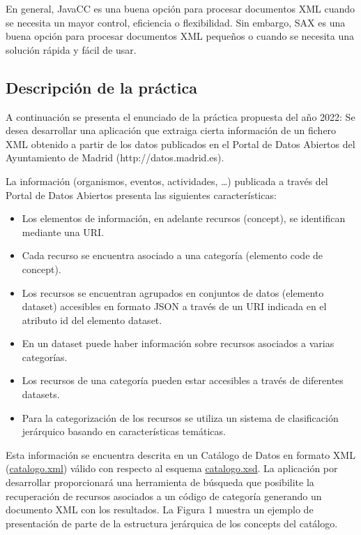 En general, JavaCC es una buena opción para procesar documentos XML cuando se necesita un mayor control, eficiencia o flexibilidad. Sin embargo, SAX es una buena opción para procesar documentos XML pequeños o cuando se necesita una solución rápida y fácil de usar.

\subsection{Descripción de la práctica}

A continuación se presenta el enunciado de la práctica propuesta del año 2022:
Se desea desarrollar una aplicación que extraiga cierta información de un fichero XML obtenido a partir de los datos publicados en el Portal de Datos Abiertos del Ayuntamiento de Madrid (http://datos.madrid.es).

La información (organismos, eventos, actividades, …) publicada a través del Portal de Datos Abiertos presenta las siguientes características:

\begin{itemize}
    \item Los elementos de información, en adelante recursos (concept), se identifican mediante una URI.
    \item Cada recurso se encuentra asociado a una categoría (elemento code de concept).
    \item Los recursos se encuentran agrupados en conjuntos de datos (elemento dataset) accesibles en formato JSON a través de un URI indicada en el atributo id del elemento dataset.
    \item En un dataset puede haber información sobre recursos asociados a varias categorías.
    \item Los recursos de una categoría pueden estar accesibles a través de diferentes datasets.
    \item Para la categorización de los recursos se utiliza un sistema de clasificación jerárquico basando en características temáticas.
\end{itemize}

Esta información se encuentra descrita en un Catálogo de Datos en formato XML (\hyperref[sec:catalogoxml]{catalogo.xml}) válido con respecto al esquema \hyperref[sec:catalogoxsd]{catalogo.xsd}.
La aplicación por desarrollar proporcionará una herramienta de búsqueda que posibilite la recuperación de recursos asociados a un código de categoría generando un documento XML con los resultados.
La Figura 1 muestra un ejemplo de presentación de parte de la estructura jerárquica de los concepts del catálogo.

